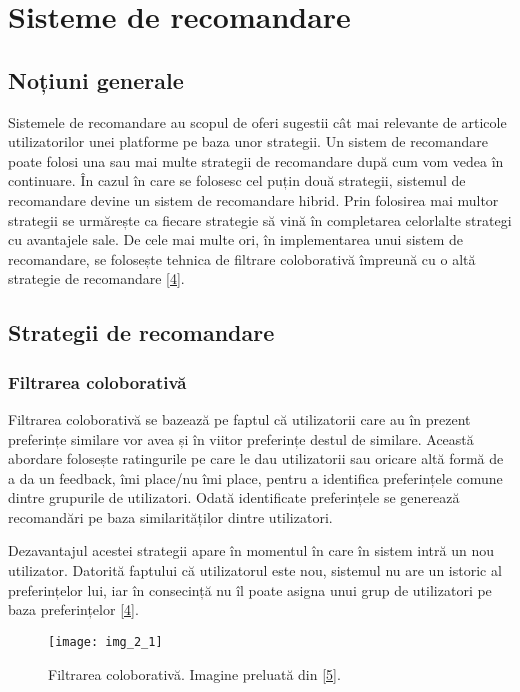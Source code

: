 \section{Sisteme de recomandare}

\subsection{Noțiuni generale}

Sistemele de recomandare au scopul de oferi sugestii cât mai relevante de articole utilizatorilor unei platforme pe baza unor strategii. Un sistem de recomandare poate folosi una sau mai multe strategii de recomandare după cum vom vedea în continuare. În cazul în care se folosesc cel puțin două strategii, sistemul de recomandare devine un sistem de recomandare hibrid. Prin folosirea mai multor strategii se urmărește ca fiecare strategie să vină în completarea celorlalte strategi cu avantajele sale. De cele mai multe ori, în implementarea unui sistem de recomandare, se folosește tehnica de filtrare coloborativă împreună cu o altă strategie de recomandare \hyperlink{ErionCanoMaurizioMorisio}{[4]}.

\subsection{Strategii de recomandare}

\subsubsection*{Filtrarea coloborativă}

Filtrarea coloborativă se bazează pe faptul că utilizatorii care au în prezent preferințe similare vor avea și în viitor preferințe destul de similare. Această abordare folosește ratingurile pe care le dau utilizatorii sau oricare altă formă de a da un feedback, îmi place/nu îmi place, pentru a identifica preferințele comune dintre grupurile de utilizatori. Odată identificate preferințele se generează recomandări pe baza similarităților dintre utilizatori. 

Dezavantajul acestei strategii apare în momentul în care în sistem intră un nou utilizator. Datorită faptului că utilizatorul este nou, sistemul nu are un istoric al preferințelor lui, iar în consecință nu îl poate asigna unui grup de utilizatori pe baza preferințelor \hyperlink{ErionCanoMaurizioMorisio}{[4]}.
\begin{figure}[!h]
	\centering
	\texttt{[image: img\_2\_1]}
	\caption[Filtrarea coloborativă]{Filtrarea coloborativă. Imagine preluată din \hyperlink{datameetsmedia}{[5]}.}
\end{figure} 

